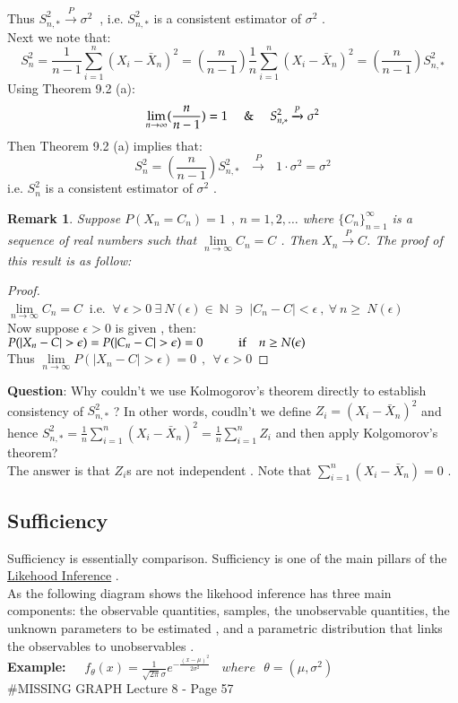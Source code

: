 \documentclass[14pt,twoside,a4paper,fleqn]{article}
\theoremstyle{plain}
\newtheorem*{remark*}{Remark}
\begin{document}
Thus $S^2_{n,*} \xrightarrow{P}\sigma^2\ $ , i.e. $S^2_{n,*}$ is a consistent estimator of $\sigma^2$ .\\
Next we note that:\\
$$
	S^2_n = \frac{1}{n-1}\sum_{i=1}^n (X_i-\bar{X}_n)^2 = (\frac{n}{n-1})\frac{1}{n}\sum_{i=1}^n (X_i - \bar{X}_n)^2 = (\frac{n}{n-1})S^2_{n,*}
$$ 
Using Theorem 9.2 (a):
$$
	\lim\limits_{n\to\infty} (\frac{n}{n-1}) = 1 \ \ \ \And\ \ \  S^2_{n,*} \xrightarrow{P} \sigma^2
$$
Then Theorem 9.2 (a) implies that:
$$
	S^2_n = (\frac{n}{n-1})S^2_{n,*}\ \ \ \xrightarrow{P}\ \ \ 1\cdot\sigma^2 = \sigma^2
$$
i.e. $S^2_n$ is a consistent estimator of $\sigma^2$ . 
\begin{remark*}
Suppose $P(X_n=C_n)=1\ \ ,\ n=1,2,\ldots$ where $\big\{C_n\big\}_{n=1}^{\infty}$ is a sequence of real numbers such that $\lim\limits_{n\to\infty} C_n = C$ . Then $X_n\xrightarrow{P}C$. The proof of this result is as follow:
\end{remark*}
\begin{proof}\hfill\\
	$\lim\limits_{n\to\infty} C_n = C\ $ i.e. $\ \forall\ \epsilon>0 \ \exists \ N(\epsilon) \in\ \mathbb{N} \ \ni\ \vert C_n - C\vert < \epsilon\ ,\ \forall\ n\geq\ N(\epsilon)$\\
	Now suppose $\epsilon > 0$ is given , then:\\
	$P(\vert X_n - C\vert > \epsilon) = P(\vert C_n - C\vert > \epsilon) = 0\hspace*{1cm} \text{if $\ \ \ n\geq N(\epsilon)$}$\\
	Thus $\lim\limits_{n\to\infty} P(\vert X_n - C\vert > \epsilon)=0\ \ ,\ \ \forall\ \epsilon>0$
\end{proof}
\textbf{Question}: Why couldn't we use Kolmogorov's theorem directly to establish consistency of $S^2_{n,*}$ ? In other words, coudln't we define \mbox{$Z_i = (X_i - \bar{X}_n)^2$} and hence \mbox{$S^2_{n,*} = \frac{1}{n}\sum_{i=1}^n (X_i - \bar{X}_n)^2 = \frac{1}{n}\sum_{i=1}^n Z_i$} and then apply Kolgomorov's \mbox{theorem?}\\
The answer is that $Z_i$s are not independent . Note that \mbox{$\sum_{i=1}^n (X_i-\bar{X}_n)=0$} .
\subsection{Sufficiency}
Sufficiency is essentially comparison. Sufficiency is one of the main pillars of the \underline{Likehood Inference} .\\
As the following diagram shows the likehood inference has three main components: the observable quantities, samples, the unobservable quantities, the unknown parameters to be estimated , and a parametric distribution that links the observables to unobservables .\\
\textbf{Example:\ \ } $f_{\theta}(x) = \frac{1}{\sqrt{2\pi}\sigma}e^{-\frac{(x-\mu)^2}{2\sigma^2}}\ \ \ \ where \ \ \ \theta = (\mu, \sigma^2)
$\\
\#MISSING GRAPH Lecture 8 - Page 57
\end{document}
